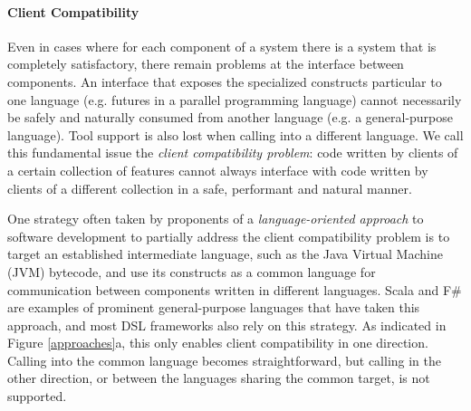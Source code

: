 
\paragraph{Client Compatibility} Even in cases where for each component of a system there is a  system that is completely satisfactory, there remain problems at the interface between components. An interface that exposes the specialized constructs particular to one language (e.g. futures in a parallel programming language) cannot necessarily be safely and naturally consumed from another language (e.g. a general-purpose language). Tool support is also lost when calling into a different language. We call this fundamental issue the \emph{client compatibility problem}: code written by clients of a certain collection of features cannot always interface with code written by clients of a different collection  in a safe, performant and natural manner.

One strategy often taken by proponents of a \emph{language-oriented approach} to software development \cite{journals/stp/Ward94} to partially address the client compatibility problem is to  target an established intermediate language, such as the Java Virtual Machine (JVM) bytecode, and use its constructs as a common language for communication between components written in different languages. Scala \cite{200464/IC} and F\# \cite{pickering2007foundations} are examples of prominent general-purpose languages that have taken this approach, and most DSL frameworks also rely on this strategy. As indicated in Figure \ref{approaches}a, this only enables client compatibility in one direction. Calling into the common language becomes straightforward, but calling in the other direction, or between the languages sharing the common target, is not supported. 

